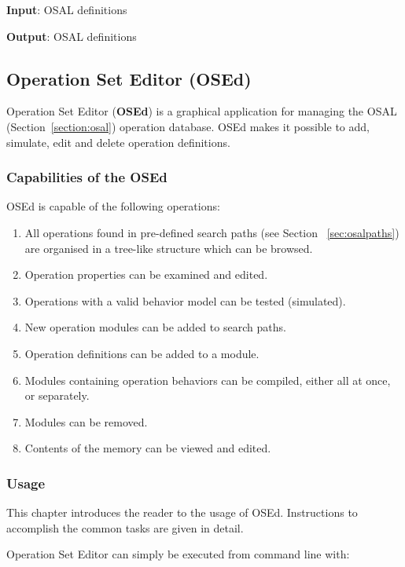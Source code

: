 \documentclass[twoside]{tceusermanual}
\begin{document}
 
\textbf{Input}: OSAL definitions 

\textbf{Output}: OSAL definitions

\subsection{Operation Set Editor (OSEd)}
\label{sec:osed}

Operation Set Editor (\textbf{OSEd}) is a graphical application for managing
the OSAL (Section~\ref{section:osal}) operation database. OSEd makes it possible
to add, simulate, edit and delete operation definitions. 

\subsubsection{Capabilities of the OSEd}

OSEd is capable of the following operations:

\begin{enumerate}
\item%
  All operations found in pre-defined search paths (see Section
  ~\ref{sec:osalpaths}) are organised in a tree-like structure which can be
  browsed.
\item%
  Operation properties can be examined and edited.
\item%
  Operations with a valid behavior model can be tested (simulated).
\item%
  New operation modules can be added to search paths.
\item%
  Operation definitions can be added to a module.
\item%
  Modules containing operation behaviors can be compiled, either all at
  once, or separately.
\item%
  Modules can be removed.
\item%
  Contents of the memory can be viewed and edited.
\end{enumerate}

\subsubsection{Usage}

This chapter introduces the reader to the usage of OSEd. Instructions to
accomplish the common tasks are given in detail.

Operation Set Editor can simply be executed from command line with:

\end{document}
